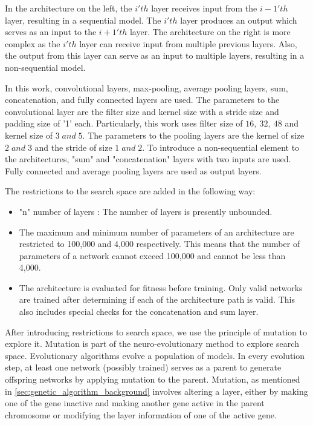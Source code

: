 In the architecture on the left, the $i'th$ layer receives input from the $i - 1'th$ layer, resulting in a sequential model. The $i'th$ layer produces an output which serves as an input to the $i + 1'th$ layer. The architecture on the right is more complex as the $i'th$ layer can receive input from multiple previous layers. Also, the output from this layer can serve as an input to multiple layers, resulting in a non-sequential model.

In this work, convolutional layers, max-pooling, average pooling layers, sum, concatenation, and fully connected layers are used. The parameters to the convolutional layer are the filter size and kernel size with a stride size and padding size of '1' each. Particularly, this work uses filter size of $16,\: 32,\: 48$ and kernel size of $3 \; and \; 5$. The parameters to the pooling layers are the kernel of size $2 \; and \; 3$ and the stride of size $1 \;  and  \; 2$. To introduce a non-sequential element to the architectures, "sum" and "concatenation" layers with two inputs are used. Fully connected and average pooling layers are used as output layers.

The restrictions to the search space are added in the following way:
\begin{itemize}
    \item "n" number of layers : The number of layers is presently unbounded.
    \item The maximum and minimum number of parameters of an architecture are restricted to 100,000 and 4,000 respectively. This means that the number of parameters of a network cannot exceed 100,000 and cannot be less than 4,000.
    \item The architecture is evaluated for fitness before training. Only valid networks are trained after determining if each of the architecture path is valid. This also includes special checks for the concatenation and sum layer.
\end{itemize}

After introducing restrictions to search space, we use the principle of mutation to explore it. Mutation is part of the neuro-evolutionary method to explore search space. Evolutionary algorithms evolve a population of models. In every evolution step, at least one network (possibly trained) serves as a parent to generate offspring networks by applying mutation to the parent. Mutation, as mentioned in \autoref{sec:genetic_algorithm_background} involves altering a layer, either by making one of the gene inactive and making another gene active in the parent chromosome or modifying the layer information of one of the active gene. 

